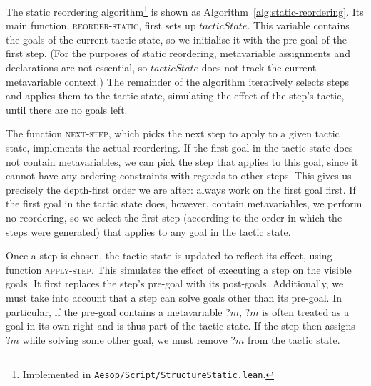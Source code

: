 \documentclass[sigplan,screen]{acmart}
\newcommand{\mvar}[1]{{?#1}}
\begin{document}
The static reordering algorithm\footnote{Implemented in \texttt{Aesop/Script/StructureStatic.lean}.} is shown as Algorithm~\ref{alg:static-reordering}.
Its main function, \textsc{reorder-static}, first sets up $\mathit{tacticState}$.
This variable contains the goals of the current tactic state, so we initialise it with the pre-goal of the first step.
(For the purposes of static reordering, metavariable assignments and declarations are not essential, so $\mathit{tacticState}$ does not track the current metavariable context.)
The remainder of the algorithm iteratively selects steps and applies them to the tactic state, simulating the effect of the step's tactic, until there are no goals left.

The function \textsc{next-step}, which picks the next step to apply to a given tactic state, implements the actual reordering.
If the first goal in the tactic state does not contain metavariables, we can pick the step that applies to this goal, since it cannot have any ordering constraints with regards to other steps.
This gives us precisely the depth-first order we are after: always work on the first goal first.
If the first goal in the tactic state does, however, contain metavariables, we perform no reordering, so we select the first step (according to the order in which the steps were generated) that applies to any goal in the tactic state.

Once a step is chosen, the tactic state is updated to reflect its effect, using function \textsc{apply-step}.
This simulates the effect of executing a step on the visible goals.
It first replaces the step's pre-goal with its post-goals.
Additionally, we must take into account that a step can solve goals other than its pre-goal.
In particular, if the pre-goal contains a metavariable $\mvar{m}$, $\mvar{m}$ is often treated as a goal in its own right and is thus part of the tactic state.
If the step then assigns $\mvar{m}$ while solving some other goal, we must remove $\mvar{m}$ from the tactic state.
\end{document}
